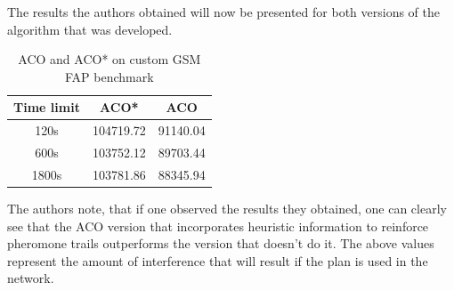The results the authors obtained will now be presented for both versions of the algorithm that was developed\cite{ACOvsEA}.

\begin{table}
\centering
	\begin{tabular}{| c | c | c |}
	\hline
	Time limit & ACO* & ACO \\ \hline
	120s & 104719.72 & 91140.04 \\ \hline
	600s & 103752.12 & 89703.44 \\ \hline
	1800s & 103781.86 & 88345.94 \\ \hline
	\end{tabular}
\caption{ACO and ACO* on custom GSM FAP benchmark}
\end{table}

The authors note, that if one observed the results they obtained, one can clearly see that the ACO version that incorporates heuristic information to reinforce pheromone trails outperforms the version that doesn't do it\cite{ACOvsEA}. The above values represent the amount of interference that will result if the plan is used in the network\cite{ACOvsEA}.
